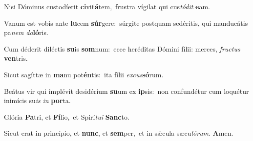 

Nisi Dóminus custodíerit \textbf{ci}vi\textbf{tá}tem,~\redgreheightstar frustra vígilat qui cus\textit{tó}\textit{dit} \textbf{e}am.

Vanum est vobis ante \textbf{lu}cem \textbf{súr}gere:~\redgreheightstar súrgite postquam sedéritis, qui manducátis pa\textit{nem} \textit{do}\textbf{ló}ris.

Cum déderit diléctis \textbf{su}is \textbf{som}num:~\redgreheightstar ecce heréditas Dómini fílii: merces, \textit{fruc}\textit{tus} \textbf{ven}tris.

Sicut sagíttæ in \textbf{ma}nu pot\textbf{én}tis:~\redgreheightstar ita fílii \textit{ex}\textit{cus}\textbf{só}rum.

Beátus vir qui implévit desidérium \textbf{su}um ex \textbf{ip}sis:~\redgreheightstar non confundétur cum loquétur inimícis su\textit{is} \textit{in} \textbf{por}ta.

Glória \textbf{Pa}tri, et \textbf{Fí}lio,~\redgreheightstar et Spirí\textit{tu}\textit{i} \textbf{Sanc}to.

Sicut erat in princípio, et \textbf{nunc}, et \textbf{sem}per,~\redgreheightstar et in sǽcula sæcu\textit{ló}\textit{rum}. \textbf{A}men.

